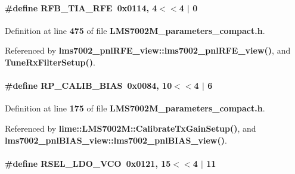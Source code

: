 \paragraph[{R\+F\+B\+\_\+\+T\+I\+A\+\_\+\+R\+FE}]{\setlength{\rightskip}{0pt plus 5cm}\#define R\+F\+B\+\_\+\+T\+I\+A\+\_\+\+R\+FE~0x0114, 4$<$$<$4 $\vert$  0}\label{LMS7002M__parameters__compact_8h_ad6506ed0d4e2cbf31ad74ed0158f38ee}


Definition at line {\bf 475} of file {\bf L\+M\+S7002\+M\+\_\+parameters\+\_\+compact.\+h}.



Referenced by {\bf lms7002\+\_\+pnl\+R\+F\+E\+\_\+view\+::lms7002\+\_\+pnl\+R\+F\+E\+\_\+view()}, and {\bf Tune\+Rx\+Filter\+Setup()}.

\paragraph[{R\+P\+\_\+\+C\+A\+L\+I\+B\+\_\+\+B\+I\+AS}]{\setlength{\rightskip}{0pt plus 5cm}\#define R\+P\+\_\+\+C\+A\+L\+I\+B\+\_\+\+B\+I\+AS~0x0084, 10$<$$<$4 $\vert$  6}\label{LMS7002M__parameters__compact_8h_afe412684aa97b85aebcaa14c03778d68}


Definition at line {\bf 175} of file {\bf L\+M\+S7002\+M\+\_\+parameters\+\_\+compact.\+h}.



Referenced by {\bf lime\+::\+L\+M\+S7002\+M\+::\+Calibrate\+Tx\+Gain\+Setup()}, and {\bf lms7002\+\_\+pnl\+B\+I\+A\+S\+\_\+view\+::lms7002\+\_\+pnl\+B\+I\+A\+S\+\_\+view()}.

\paragraph[{R\+S\+E\+L\+\_\+\+L\+D\+O\+\_\+\+V\+CO}]{\setlength{\rightskip}{0pt plus 5cm}\#define R\+S\+E\+L\+\_\+\+L\+D\+O\+\_\+\+V\+CO~0x0121, 15$<$$<$4 $\vert$  11}\label{LMS7002M__parameters__compact_8h_ad7e95a4ff20689dd76263459d613bfa3}


